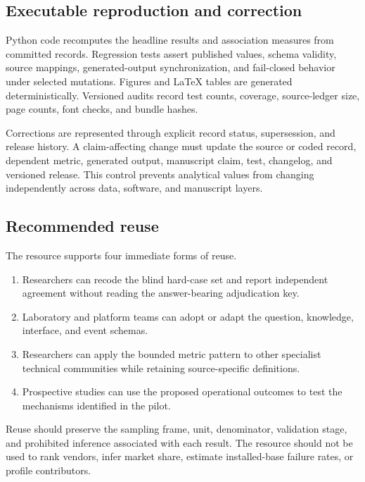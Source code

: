\subsection{Executable reproduction and correction}

Python code recomputes the headline results and association measures from committed records. Regression tests assert published values, schema validity, source mappings, generated-output synchronization, and fail-closed behavior under selected mutations. Figures and LaTeX tables are generated deterministically. Versioned audits record test counts, coverage, source-ledger size, page counts, font checks, and bundle hashes.

Corrections are represented through explicit record status, supersession, and release history. A claim-affecting change must update the source or coded record, dependent metric, generated output, manuscript claim, test, changelog, and versioned release. This control prevents analytical values from changing independently across data, software, and manuscript layers.

\subsection{Recommended reuse}

The resource supports four immediate forms of reuse.
\begin{enumerate}
  \item Researchers can recode the blind hard-case set and report independent agreement without reading the answer-bearing adjudication key.
  \item Laboratory and platform teams can adopt or adapt the question, knowledge, interface, and event schemas.
  \item Researchers can apply the bounded metric pattern to other specialist technical communities while retaining source-specific definitions.
  \item Prospective studies can use the proposed operational outcomes to test the mechanisms identified in the pilot.
\end{enumerate}

Reuse should preserve the sampling frame, unit, denominator, validation stage, and prohibited inference associated with each result. The resource should not be used to rank vendors, infer market share, estimate installed-base failure rates, or profile contributors.
